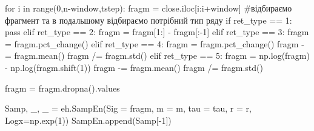 \documentclass[
  letterpaper,
]{report}
\newenvironment{Shaded}{\begin{snugshade}}{\end{snugshade}}
\newcommand{\BuiltInTok}[1]{\textcolor[rgb]{0.00,0.23,0.31}{#1}}
\newcommand{\CommentTok}[1]{\textcolor[rgb]{0.37,0.37,0.37}{#1}}
\newcommand{\ControlFlowTok}[1]{\textcolor[rgb]{0.00,0.23,0.31}{#1}}
\newcommand{\DecValTok}[1]{\textcolor[rgb]{0.68,0.00,0.00}{#1}}
\newcommand{\KeywordTok}[1]{\textcolor[rgb]{0.00,0.23,0.31}{#1}}
\newcommand{\NormalTok}[1]{\textcolor[rgb]{0.00,0.23,0.31}{#1}}
\newcommand{\OperatorTok}[1]{\textcolor[rgb]{0.37,0.37,0.37}{#1}}
\begin{document}
\begin{Shaded}
\begin{Highlighting}[]
\ControlFlowTok{for}\NormalTok{ i }\KeywordTok{in} \BuiltInTok{range}\NormalTok{(}\DecValTok{0}\NormalTok{,n}\OperatorTok{{-}}\NormalTok{window,tstep):}
\NormalTok{    fragm }\OperatorTok{=}\NormalTok{ close.iloc[i:i}\OperatorTok{+}\NormalTok{window] }\CommentTok{\#відбираємо фрагмент та в подальшому відбираємо потрібний тип ряду}
    \ControlFlowTok{if}\NormalTok{ ret\_type }\OperatorTok{==} \DecValTok{1}\NormalTok{:}
        \ControlFlowTok{pass}
    \ControlFlowTok{elif}\NormalTok{ ret\_type }\OperatorTok{==} \DecValTok{2}\NormalTok{:}
\NormalTok{        fragm }\OperatorTok{=}\NormalTok{ fragm[}\DecValTok{1}\NormalTok{:] }\OperatorTok{{-}}\NormalTok{ fragm[:}\OperatorTok{{-}}\DecValTok{1}\NormalTok{]}
    \ControlFlowTok{elif}\NormalTok{ ret\_type }\OperatorTok{==} \DecValTok{3}\NormalTok{:}
\NormalTok{        fragm }\OperatorTok{=}\NormalTok{ fragm.pct\_change()}
    \ControlFlowTok{elif}\NormalTok{ ret\_type }\OperatorTok{==} \DecValTok{4}\NormalTok{:}
\NormalTok{        fragm }\OperatorTok{=}\NormalTok{ fragm.pct\_change()}
\NormalTok{        fragm }\OperatorTok{{-}=}\NormalTok{ fragm.mean()}
\NormalTok{        fragm }\OperatorTok{/=}\NormalTok{ fragm.std()}
    \ControlFlowTok{elif}\NormalTok{ ret\_type }\OperatorTok{==} \DecValTok{5}\NormalTok{:}
\NormalTok{        fragm }\OperatorTok{=}\NormalTok{ np.log(fragm) }\OperatorTok{{-}}\NormalTok{ np.log(fragm.shift(}\DecValTok{1}\NormalTok{))}
\NormalTok{        fragm }\OperatorTok{{-}=}\NormalTok{ fragm.mean()}
\NormalTok{        fragm }\OperatorTok{/=}\NormalTok{ fragm.std()}
        
\NormalTok{    fragm }\OperatorTok{=}\NormalTok{ fragm.dropna().values}
    
\NormalTok{    Samp, \_, \_ }\OperatorTok{=}\NormalTok{ eh.SampEn(Sig }\OperatorTok{=}\NormalTok{ fragm, m }\OperatorTok{=}\NormalTok{ m, tau }\OperatorTok{=}\NormalTok{ tau, r }\OperatorTok{=}\NormalTok{ r, Logx}\OperatorTok{=}\NormalTok{np.exp(}\DecValTok{1}\NormalTok{))}
\NormalTok{    SampEn.append(Samp[}\OperatorTok{{-}}\DecValTok{1}\NormalTok{])}
\end{Highlighting}
\end{Shaded}
\end{document}
